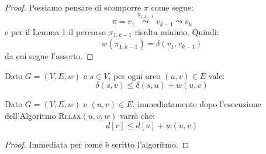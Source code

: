 \begin{proof}
	Possiamo pensare di scomporre $\pi$ come segue:
\begin{displaymath}
	\pi = v_{1} \stackrel{\pi_{1,k-1}}{\leadsto}v_{k-1} \leadsto v_{k}
\end{displaymath}
e per il Lemma 1 il percorso $\pi_{1,k-1}$ risulta minimo. Quindi:
\begin{displaymath}
	w(\pi_{1,k-1}) = \delta(v_{1},v_{k-1})
\end{displaymath} da cui segue l'asserto.
\end{proof}

\begin{lemmabox}
	Dato $G=(V,E,w)$ e $s \in V$, per ogni arco $(u,v) \in E$ vale:
	\begin{equation}
		\delta(s,v) \leq \delta(s,u) + w(u,v)
	\end{equation}
\end{lemmabox}


\begin{lemmabox}
		Dato $G=(V,E,w)$ e $(u,v) \in E$, immediatamente dopo l'esecuzione dell'Algoritmo \textsc{Relax}$(u,v,w)$ varrà che:
	\begin{displaymath}
		d[v] \leq d[u] + w(u,v)
	\end{displaymath}
\end{lemmabox}

\begin{proof}
	Immediata per come è scritto l'algoritmo.
\end{proof}


